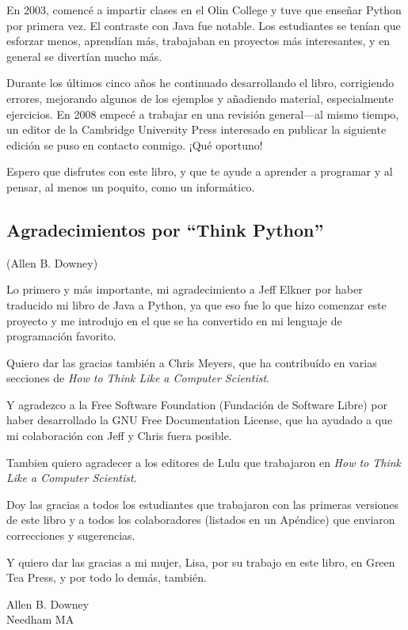 En 2003, comencé a impartir clases en el Olin College y tuve que enseñar
Python por primera vez. El contraste con Java fue notable.
Los estudiantes se tenían que esforzar menos, aprendían más, trabajaban
en proyectos más interesantes, y en general se divertían mucho más.

Durante los últimos cinco años he continuado desarrollando el libro,
corrigiendo errores, mejorando algunos de los ejemplos y
añadiendo material, especialmente ejercicios. En 2008 empecé a trabajar
en una revisión general---al mismo tiempo, un editor
de la Cambridge University Press interesado en publicar la
siguiente edición se puso en contacto conmigo. ¡Qué oportuno!

Espero que disfrutes con este libro, y que te ayude
a aprender a programar y al pensar, al menos un poquito, como
un informático.

\subsection*{Agradecimientos por ``Think Python''}

(Allen B. Downey)

Lo primero y más importante, mi agradecimiento a Jeff Elkner por
haber traducido mi libro de Java a Python, ya que eso fue lo que hizo
comenzar este proyecto y me introdujo en el que se ha convertido
en mi lenguaje de programación favorito.

Quiero dar las gracias también a Chris Meyers, que ha contribuído en varias
secciones de \emph{How to Think Like a Computer Scientist}.

Y agradezco a la Free Software Foundation (Fundación de Software Libre) por
haber desarrollado la GNU Free Documentation License, que ha ayudado
a que mi colaboración con Jeff y Chris fuera posible.


Tambien quiero agradecer a los editores de Lulu que trabajaron en
\emph{How to Think Like a Computer Scientist}.

Doy las gracias a todos los estudiantes que trabajaron con las
primeras versiones de este libro y a todos los colaboradores (listados
en un Apéndice) que enviaron correcciones y sugerencias.

Y quiero dar las gracias a mi mujer, Lisa, por su trabajo en este libro, en Green
Tea Press, y por todo lo demás, también.

Allen B. Downey \\
Needham MA\\

